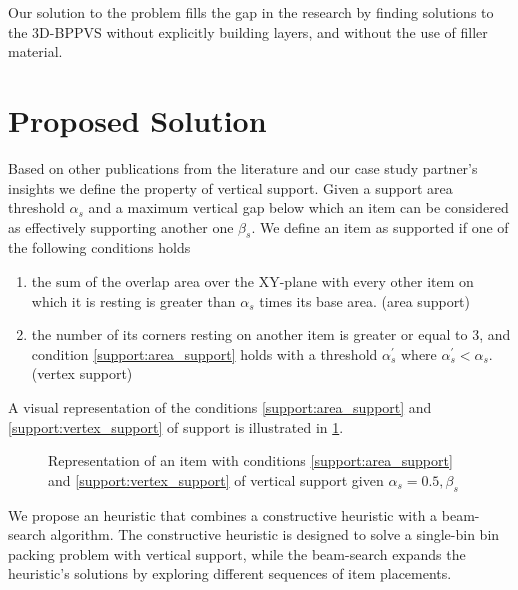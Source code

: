 \documentclass[11pt,a4paper,twocolumn]{article}
\begin{document}
Our solution to the problem fills the gap in the research by finding solutions to the 3D-BPPVS without explicitly building layers, and without the use of filler material.

\section{Proposed Solution}

Based on other publications from the literature and our case study partner's insights we define the property of vertical support.
Given a support area threshold $\alpha_s$ and a maximum vertical gap below which an item can be considered as effectively supporting another one $\beta_s$. We define an item as supported if one of the following conditions holds
\begin{enumerate}[label={\textbf{Condition \arabic*}.},ref={\arabic*},leftmargin=*]
    \item the sum of the overlap area over the XY-plane with every other item on which it is resting is greater than $\alpha_s$ times its base area. (area support) \label{support:area_support}
    \item the number of its corners resting on another item is greater or equal to 3, and condition \ref{support:area_support} holds with a threshold $\alpha^\prime_s$ where $\alpha^\prime_s < \alpha_s$. (vertex support) \label{support:vertex_support}
\end{enumerate}
A visual representation of the conditions \ref{support:area_support} and \ref{support:vertex_support} of support is illustrated in \cref{fig:support}.

\begin{figure}[h]
    \resizebox{\columnwidth}{!}{%
    
    }
    \caption{Representation of an item with conditions \ref{support:area_support} and \ref{support:vertex_support} of vertical support given $\alpha_s = 0.5, \beta_s$}
    \label{fig:support}
\end{figure}

We propose an heuristic that combines a constructive heuristic with a beam-search algorithm.
The constructive heuristic is designed to solve a single-bin bin packing problem with vertical support, while the beam-search expands the heuristic's solutions by exploring different sequences of item placements.

\end{document}
